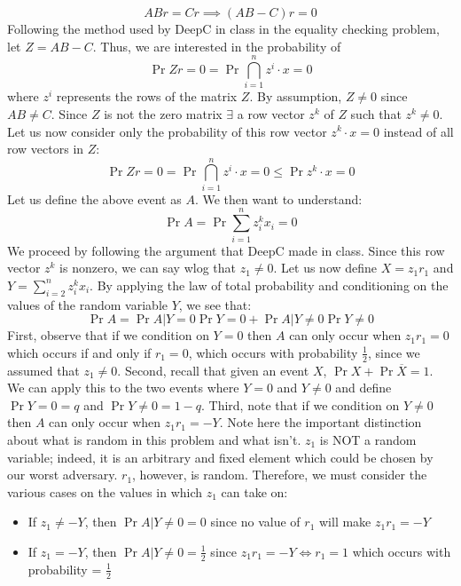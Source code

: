 \documentclass[12pt]{article}
\begin{document}
\begin{solution}
\begin{itemize}
    \[
    ABr = Cr \implies (AB-C)r = 0
    \]
    Following the method used by DeepC in class in the equality checking problem, let $Z = AB-C$. Thus, we are interested in the probability of
    \[
    \Pr{Zr = 0} = \Pr{\bigcap_{i=1}^n z^i \cdot x = 0}
    \]
    where $z^i$ represents the rows of the matrix $Z$. By assumption, $Z \neq 0$ since $AB \neq C$. Since $Z$ is not the zero matrix $\exists$ a row vector $z^k$ of $Z$ such that $z^k \neq 0$. Let us now consider only the probability of this row vector $z^k \cdot x = 0$ instead of all row vectors in $Z$:
    \[
    \Pr{Zr = 0} = \Pr{\bigcap_{i=1}^n z^i \cdot x = 0} \leq \Pr{z^k \cdot x = 0}
    \]
    Let us define the above event as $A$. We then want to understand:
    \[
    \Pr{A} = \Pr{\sum_{i=1}^n{z^{k}_{i}x_i} = 0}
    \]
    We proceed by following the argument that DeepC made in class. Since this row vector $z^k$ is nonzero, we can say wlog that $z_1 \neq 0$. Let us now define $X = z_1r_1$ and $Y=\sum_{i=2}^n{z^{k}_{i}x_i}$. By applying the law of total probability and conditioning on the values of the random variable $Y$, we see that:
    \[
    \Pr{A} = \Pr{A|Y=0}\Pr{Y=0} + \Pr{A|Y\neq0}\Pr{Y\neq0}
    \]
    First, observe that if we condition on $Y=0$ then $A$ can only occur when $z_1r_1 =0$ which occurs if and only if $r_1=0$, which occurs with probability $\frac{1}{2}$, since we assumed that $z_1 \neq 0$. Second, recall that given an event $X$, $\Pr{X} +\Pr{\overline{X}} = 1$. We can apply this to the two events where $Y=0$ and $Y\neq0$ and define $\Pr{Y=0} = q$ and $\Pr{Y\neq0} = 1-q$. Third, note that if we condition on $Y\neq0$ then $A$ can only occur when  $z_1r_1 =-Y$. Note here the important distinction about what is random in this problem and what isn't. $z_1$ is NOT a random variable; indeed, it is an arbitrary and fixed element which could be chosen by our worst adversary. $r_1$, however, is random. Therefore, we must consider the various cases on the values in which $z_1$ can take on:
    \begin{itemize}
        \item If $z_1 \neq -Y$, then $\Pr{A|Y\neq 0} = 0$ since no value of $r_1$ will make $z_1r_1=-Y$
        \item If $z_1 = -Y$, then $\Pr{A|Y\neq 0} = \frac{1}{2}$ since $z_1r_1=-Y \iff r_1=1$ which occurs with probability = $\frac{1}{2}$
    \end{itemize}
    

\end{itemize}
\end{solution}
\end{document}
